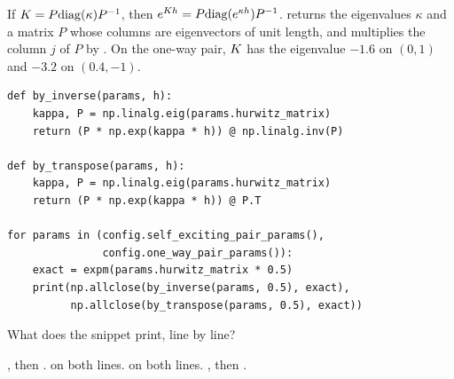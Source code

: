 \begin{question}
\label{question.eigenvectorsTransposedForTheInverse}
If $K = P \mathrm{diag}(\kappa) P^{-1}$,
then $e^{K h} = P \mathrm{diag}(e^{\kappa h}) P^{-1}$.
 returns the eigenvalues $\kappa$
and a matrix $P$ whose columns are eigenvectors of unit length,
and  multiplies the column $j$ of $P$ by .
On the one-way pair, $K$ has the eigenvalue $-1.6$ on $(0, 1)$
and $-3.2$ on $(0.4, -1)$.
\begin{lstlisting}[caption={Two inverses of the eigenvectors}, label=listing.eigenvectorsTransposedForTheInverse]
def by_inverse(params, h):
    kappa, P = np.linalg.eig(params.hurwitz_matrix)
    return (P * np.exp(kappa * h)) @ np.linalg.inv(P)

def by_transpose(params, h):
    kappa, P = np.linalg.eig(params.hurwitz_matrix)
    return (P * np.exp(kappa * h)) @ P.T

for params in (config.self_exciting_pair_params(),
               config.one_way_pair_params()):
    exact = expm(params.hurwitz_matrix * 0.5)
    print(np.allclose(by_inverse(params, 0.5), exact),
          np.allclose(by_transpose(params, 0.5), exact))
\end{lstlisting}
What does the snippet print, line by line?
\begin{choices}
 \correctchoice {}, then .
 \choice {} on both lines.
 \choice {} on both lines.
 \choice {}, then .
\end{choices}
\end{question}

